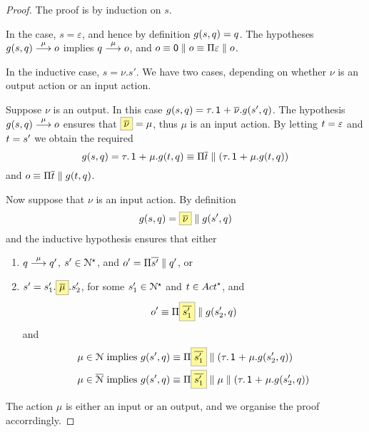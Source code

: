 \begin{proof}
  The proof is by induction on $s$.


  In the case, $s = \varepsilon$, and hence
  by definition $g(s, q) = q$. The
  hypotheses $g(s, q) \mathrel{\overset{ \mu }\longrightarrow} o$ implies
  $q \mathrel{\overset{\mu}\longrightarrow} o$, and $o \equiv \mathop{\textsf{0}} \mathrel{\parallel} o \equiv \Pi{ \varepsilon } \mathrel{\parallel} o$.


  In the inductive case, $s = \nu . s'$.
  We have two cases, depending on whether $\nu$ is an output action
  or an input action.


  Suppose $\nu$ is an output. In this case
  $g(s, q) = \tau.\mathop{\textsf{1}} \mathrel{+} \overline{\nu}.g(s', q)$.
  The hypothesis $g(s, q) \mathrel{\overset{ \mu }\longrightarrow} o$ ensures that $\out{\nu} = \mu$,
  thus $\mu$ is an input action.
  By letting $t = \varepsilon$ and $t = s'$ we obtain the required
  $$
  g(s, q) = \tau.\mathop{\textsf{1}} \mathrel{+} \mu.g(t, q) \equiv \Pi \overline{t} \mathrel{\parallel} (\tau.\mathop{\textsf{1}} \mathrel{+} \mu.g(t, q))
  $$
  and $ o \equiv \Pi \overline{t} \mathrel{\parallel} g(t, q)$.



  Now suppose that $\nu$ is an input action.
  By definition
  \begin{equation}
    \label{eq:gs-action-shape-gensq}
    \gen{s}{q} = \out{\nu} \Par \gen{s'}{q}
  \end{equation}
  and the inductive hypothesis ensures that either
  \begin{enumerate}[(1)]
  \item\label{pt:gs-input-1} $q \mathrel{\overset{\mu}\longrightarrow} q'$, $s' \in \mathcal{N}^\star$, and $o' = \Pi \overline{s'} \mathrel{\parallel} q'$, or
  \item\label{pt:gs-input-2} $s' =  s'_1 .\out{\mu}. s'_2$, for some $s'_1 \in \mathcal{N}^{\star} $ and $\traceB \in \Actfin$, and
    \begin{equation}
      \label{eq:gs-input-shape-o'}
      o' \equiv  \Pi \out{s'_1} \Par \gen{s'_2}{q}
    \end{equation}
    and
\begin{align}
      \label{eq:gs-input-shape-gs'}
      \mu \in \Names &\text{ implies }\gen{s'}{q}  \equiv  \Pi \out{s'_1} \Par (\tau.\Unit \extc \mu.\gen{s'_2}{q})\\
      \label{eq:gs-input-shape-gs'-out}
      \mu \in \co{\Names} &\text{ implies } \gen{s'}{q}  \equiv  \Pi \out{s'_1} \Par \mu \Par (\tau.\Unit \extc \mu.\gen{s'_2}{q})
\end{align}
  \end{enumerate}
  The action $\mu$ is either an input or an  output, and we organise the proof accorrdingly.



\end{proof}
